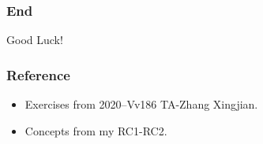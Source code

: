 \documentclass{beamer}
\begin{document}
\begin{frame}
    \frametitle{End}
    \centering
    \LARGE{Good Luck!}

\end{frame}
\begin{frame}
    \frametitle{Reference}
    \begin{itemize}
        \item Exercises from 2020--Vv186 TA-Zhang Xingjian.
        \item Concepts from my RC1-RC2.
     \end{itemize}
\end{frame}
\end{document}
